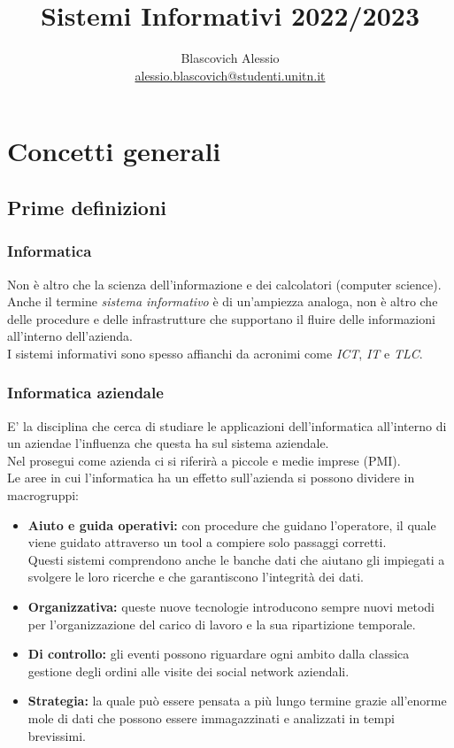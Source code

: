 \documentclass{book}
\title{Sistemi Informativi 2022/2023}
\author{Blascovich Alessio\\
    \href{mailto:alessio.blascovich@studenti.unitn.it}{alessio.blascovich@studenti.unitn.it}}
\date{}
\begin{document}
    \maketitle
    \tableofcontents
    \chapter{Concetti generali}
    \section{Prime definizioni}
    \subsection{Informatica}
    Non è altro che la scienza dell'informazione e dei calcolatori (computer science).\\
    Anche il termine \emph{sistema informativo} è di un'ampiezza analoga, non è altro che delle procedure e delle infrastrutture che supportano il fluire delle informazioni all'interno dell'azienda.\\
    I sistemi informativi sono spesso affianchi da acronimi come \emph{ICT}, \emph{IT} e \emph{TLC}.
    \subsection{Informatica aziendale}
    E' la disciplina che cerca di studiare le applicazioni dell'informatica all'interno di un aziendae l'influenza che questa ha sul sistema aziendale.\\
    Nel prosegui come azienda ci si riferirà a piccole e medie imprese (PMI).\\
    Le aree in cui l'informatica ha un effetto sull'azienda si possono dividere in macrogruppi:
    \begin{itemize}
        \item \textbf{Aiuto e guida operativi:} con procedure che guidano l'operatore, il quale viene guidato   attraverso un tool a compiere solo passaggi corretti.\\
            Questi sistemi comprendono anche le banche dati che aiutano gli impiegati a svolgere le loro ricerche e che garantiscono l'integrità dei dati.
        \item \textbf{Organizzativa:} queste nuove tecnologie introducono sempre nuovi metodi per l'organizzazione del carico di lavoro e la sua ripartizione temporale.
        \item \textbf{Di controllo:} gli eventi possono riguardare ogni ambito dalla classica gestione degli ordini alle visite dei social network aziendali.
        \item \textbf{Strategia:} la quale può essere pensata a più lungo termine grazie all'enorme mole di dati che possono essere immagazzinati e analizzati in tempi brevissimi.
    \end{itemize}
\end{document}
